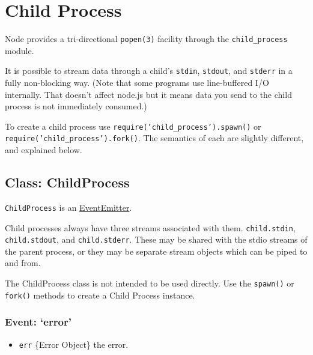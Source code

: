 \section{Child Process}

\begin{Shaded}
\begin{Highlighting}[]
\NormalTok{: } 
\end{Highlighting}
\end{Shaded}

Node provides a tri-directional \texttt{popen(3)} facility through the
\texttt{child\_process} module.

It is possible to stream data through a child's \texttt{stdin},
\texttt{stdout}, and \texttt{stderr} in a fully non-blocking way. (Note
that some programs use line-buffered I/O internally. That doesn't affect
node.js but it means data you send to the child process is not
immediately consumed.)

To create a child process use \texttt{require('child\_process').spawn()}
or \texttt{require('child\_process').fork()}. The semantics of each are
slightly different, and explained below.

\subsection{Class: ChildProcess}

\texttt{ChildProcess} is an
\href{events.html\#events\_class\_events\_eventemitter}{EventEmitter}.

Child processes always have three streams associated with them.
\texttt{child.stdin}, \texttt{child.stdout}, and \texttt{child.stderr}.
These may be shared with the stdio streams of the parent process, or
they may be separate stream objects which can be piped to and from.

The ChildProcess class is not intended to be used directly. Use the
\texttt{spawn()} or \texttt{fork()} methods to create a Child Process
instance.

\subsubsection{Event: `error'}

\begin{itemize}
\item
  \texttt{err} \{Error Object\} the error.
\end{itemize}

